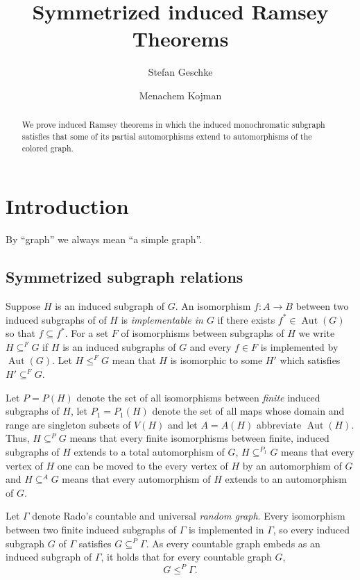 \documentclass[11pt]{amsart}
\title{Symmetrized induced Ramsey Theorems}
\author{Stefan Geschke}
\author{Menachem Kojman}
\newcommand{\su}{\subseteq}
\newcommand{\aut}{\operatorname{Aut}}
\begin{document}
\maketitle

\begin{abstract}
We prove induced Ramsey theorems in which the induced
monochromatic subgraph  satisfies that  some of its partial automorphisms
extend to  automorphisms of the  colored graph.
\end{abstract}

\section{Introduction}
By ``graph'' we always  mean  ``a simple graph''.


\subsection{Symmetrized subgraph relations}
Suppose $H$ is an induced subgraph of $G$. An isomorphism $f:A\to B$
between two induced subgraphs of of $H$ is \emph{implementable in $G$}
if there exists $f^*\in \aut (G)$ so that $f\su f^*$. For a set $F$ of
isomorphisms between subgraphs of $H$ we write $H\su ^{F} G$ if $H$ is
an induced subgraphs of $G$ and every $f\in F$ is implemented by $\aut
(G)$. Let $H\le ^F G$ mean that $H$
is isomorphic to some $H'$ which satisfies $H'\su ^F G$.


Let $P=P(H)$ denote the set of all isomorphisms between \emph{finite}
induced subgraphs of $H$, let $P_1=P_1(H)$ denote the set of all maps
whose domain and range are singleton subsets of $V(H)$ and let
$A=A(H)$ abbreviate $\aut (H)$. Thus, $H\su ^P G$ means that every
finite isomorphisms between finite, induced subgraphs of $H$ extends
to a total automorphism of $G$, $H\su^{P_1} G$ means that every vertex
of $H$ one can be moved to the every vertex of $H$ by an automorphism
of $G$ and $H\su ^A G$ means that every automorphism of $H$ extends to
an automorphism of $G$.



Let $\Gamma$ denote Rado's countable and universal \emph{random
  graph}. Every isomorphism between two finite induced subgraphs of
$\Gamma$ is implemented in $\Gamma$, so every induced subgraph
$G$ 
of $\Gamma$ satisfies $G\su ^P \Gamma$. As every
countable graph embeds as an induced subgraph of $\Gamma$, 
it holds that for every countable graph $G$,
\begin{equation}G\le ^P \Gamma.
\end{equation} 
\end{document}
